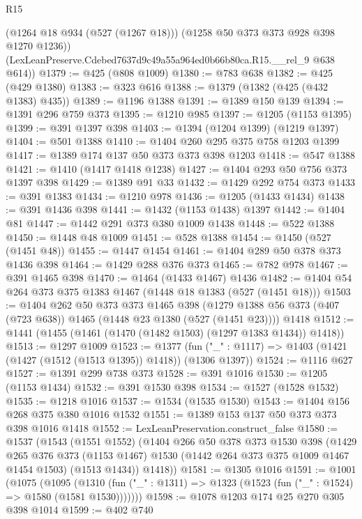 \begin{lexlean}{R15}
\begin{coremodule}
        (@1264 @18 @934 (@527 (@1267 @18)))
        (@1258 @50 @373 @373 @928 @398 @1270 @1236))
      (LexLeanPreserve.Cdebed7637d9c49a55a964ed0b66b80ca.R15.__rel_9 @638 @614))
@1379 := @425 (@808 @1009)
@1380 := @783 @638
@1382 := @425 (@429 @1380)
@1383 := @323 @616
@1388 := @1379 (@1382 (@425 (@432 @1383) @435))
@1389 := @1196 @1388
@1391 := @1389 @150 @139
@1394 := @1391 @296 @759 @373
@1395 := @1210 @985
@1397 := @1205 (@1153 @1395)
@1399 := @391 @1397 @398
@1403 := @1394 (@1204 @1399) (@1219 @1397)
@1404 := @501 @1388
@1410 := @1404 @260 @295 @375 @758 @1203 @1399
@1417 := @1389 @174 @137 @50 @373 @373 @398 @1203
@1418 := @547 @1388
@1421 := @1410 (@1417 @1418 @1238)
@1427 := @1404 @293 @50 @756 @373 @1397 @398
@1429 := @1389 @91 @33
@1432 := @1429 @292 @754 @373
@1433 := @391 @1383
@1434 := @1210 @978
@1436 := @1205 (@1433 @1434)
@1438 := @391 @1436 @398
@1441 := @1432 (@1153 @1438) @1397
@1442 := @1404 @81
@1447 := @1442 @291 @373 @380 @1009 @1438
@1448 := @522 @1388
@1450 := @1448 @48 @1009
@1451 := @528 @1388
@1454 := @1450 (@527 (@1451 @48))
@1455 := @1447 @1454
@1461 := @1404 @289 @50 @378 @373 @1436 @398
@1464 := @1429 @288 @376 @373
@1465 := @782 @978
@1467 := @391 @1465 @398
@1470 := @1464 (@1433 @1467) @1436
@1482 := @1404 @54 @264 @373 @375 @1383 @1467 (@1448 @18 @1383 (@527 (@1451 @18)))
@1503 := @1404
    @262
    @50
    @373
    @373
    @1465
    @398
    (@1279 @1388 @56 @373 (@407 (@723 @638)) @1465 (@1448 @23 @1380 (@527 (@1451 @23))))
    @1418
@1512 := @1441 (@1455 (@1461 (@1470 (@1482 @1503) (@1297 @1383 @1434)) @1418))
@1513 := @1297 @1009
@1523 := @1377
    (fun ("_" : @1117) => @1403 (@1421 (@1427 (@1512 (@1513 @1395)) @1418)) (@1306 @1397))
@1524 := @1116 @627
@1527 := @1391 @299 @738 @373
@1528 := @391 @1016
@1530 := @1205 (@1153 @1434)
@1532 := @391 @1530 @398
@1534 := @1527 (@1528 @1532)
@1535 := @1218 @1016
@1537 := @1534 (@1535 @1530)
@1543 := @1404 @156 @268 @375 @380 @1016 @1532
@1551 := @1389 @153 @137 @50 @373 @373 @398 @1016 @1418
@1552 := LexLeanPreservation.construct_false
@1580 := @1537
    (@1543
      (@1551 @1552)
      (@1404
        @266
        @50
        @378
        @373
        @1530
        @398
        (@1429
          @265
          @376
          @373
          (@1153 @1467)
          @1530
          (@1442 @264 @373 @375 @1009 @1467 @1454 @1503)
          (@1513 @1434))
        @1418))
@1581 := @1305 @1016
@1591 := @1001
    (@1075
      (@1095
        (@1310 (fun ("_" : @1311) => @1323 (@1523 (fun ("_" : @1524) => @1580 (@1581 @1530)))))))
@1598 := @1078 @1203 @174 @25 @270 @305 @398 @1014
@1599 := @402 @740

\end{coremodule}
\end{lexlean}
